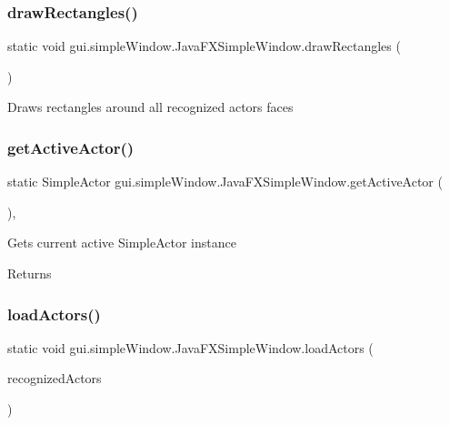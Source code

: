 \subsubsection{\texorpdfstring{draw\+Rectangles()}{drawRectangles()}}
{\footnotesize\ttfamily static void gui.\+simple\+Window.\+Java\+F\+X\+Simple\+Window.\+draw\+Rectangles (\begin{DoxyParamCaption}{ }\end{DoxyParamCaption})\hspace{0.3cm}{\ttfamily [static]}}

Draws rectangles around all recognized actors\textquotesingle{} faces \mbox{\label{classgui_1_1simple_window_1_1_java_f_x_simple_window_ab78796ce0d97c16afb468a84f8b7726c}} 
\subsubsection{\texorpdfstring{get\+Active\+Actor()}{getActiveActor()}}
{\footnotesize\ttfamily static Simple\+Actor gui.\+simple\+Window.\+Java\+F\+X\+Simple\+Window.\+get\+Active\+Actor (\begin{DoxyParamCaption}{ }\end{DoxyParamCaption})\hspace{0.3cm}{\ttfamily [static]}, {\ttfamily [private]}}

Gets current active Simple\+Actor instance \begin{DoxyReturn}{Returns}

\end{DoxyReturn}
\mbox{\label{classgui_1_1simple_window_1_1_java_f_x_simple_window_a0e3bf876c67e39d1f7ae354c971ecf7f}} 
\subsubsection{\texorpdfstring{load\+Actors()}{loadActors()}}
{\footnotesize\ttfamily static void gui.\+simple\+Window.\+Java\+F\+X\+Simple\+Window.\+load\+Actors (\begin{DoxyParamCaption}\item[{Array\+List$<$ Simple\+Actor $>$}]{recognized\+Actors }\end{DoxyParamCaption})\hspace{0.3cm}{\ttfamily [static]}}

